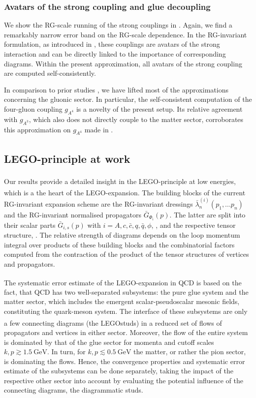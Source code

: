 \documentclass[aps,twocolumn,prd,superscriptaddress]{revtex4-2}
\newcommand{\LEGO}{LEGO\textsuperscript{\textregistered}}
\begin{document}
\subsubsection{Avatars of the strong coupling and glue decoupling }
\label{sec:ResultsAvatars}

We show the RG-scale running of the strong couplings in . Again, we find a remarkably narrow error band on the RG-scale dependence. In the RG-invariant formulation, as introduced in , these couplings are avatars of the strong interaction and can be directly linked to the importance of corresponding diagrams.
Within the present approximation, all avatars of the strong coupling are computed self-consistently.

In comparison to prior studies \cite{Braun:2014ata, Fu:2019hdw}, we have lifted most of the approximations concerning the gluonic sector. In particular, the self-consistent computation of the four-gluon coupling $g_{A^4}$ is a novelty of the present setup. Its relative agreement with $g_{A^3}$, which also does not directly couple to the matter sector, corroborates this approximation on $g_{A^4}$ made in \cite{Braun:2014ata, Fu:2019hdw}.


\subsection{\LEGO-principle at work}
\label{sec:Legoatwork}

Our results provide a detailed insight in the \LEGO-principle at low energies, which is a the heart of the \LEGO-expansion. The building blocks of the current RG-invariant expansion scheme are the RG-invariant dressings $\bar\lambda^{(i)}_n(p_1,...p_n)$ and the RG-invariant normalised propagators $\bar G_{\Phi_i}(p)$. The latter are split into their scalar parts $\bar G_{i,s}(p)$ with $i=A,c,\bar c , q,\bar q, \phi$, , and the respective tensor structure, . The relative strength of diagrams depends on the loop momentum integral over products of these building blocks and the combinatorial factors computed from the contraction of the product of the tensor structures of vertices and propagators. 

The systematic error estimate of the \LEGO-expansion in QCD is based on the fact, that QCD has two well-separated subsystems: the pure glue system and the matter sector, which includes the emergent scalar-pseudoscalar mesonic fields, constituting the quark-meson system. The interface of these subsystems are only a few connecting diagrams (the \LEGO studs) in a reduced set of flows of propagators and vertices in either sector. Moreover, the flow of the entire system is dominated by that of the glue sector for momenta and cutoff scales $k,p\gtrsim \qty{1.5}{\GeV}$. In turn, for $k,p\lesssim \qty{0.5}{\GeV}$ the matter, or rather the pion sector, is dominating the flows. Hence, the convergence properties and systematic error estimate of the subsystems can be done separately, taking the impact of the respective other sector into account by evaluating the potential influence of the connecting diagrams, the diagrammatic studs. 
\end{document}
